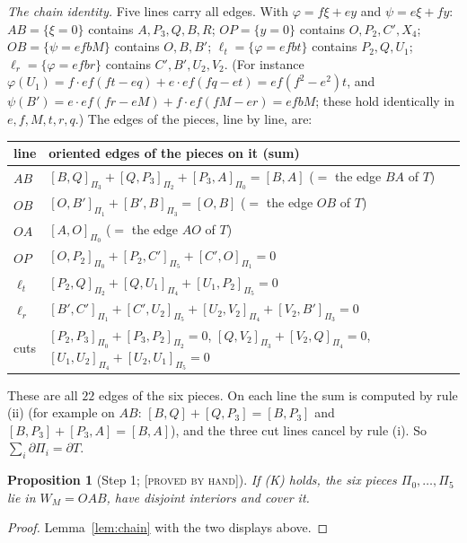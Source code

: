 \documentclass[11pt,reqno]{amsart}
\theoremstyle{plain}
\newtheorem{proposition}[theorem]{Proposition}
\theoremstyle{definition}
\newcommand{\lab}[1]{\textup{[\textsc{#1}]}}
\newcommand{\PH}{\lab{proved by hand}}
\begin{document}
\emph{The chain identity.} Five lines carry all edges. With $\varphi=f\xi+ey$ and $\psi=e\xi+fy$: $AB=\{\xi=0\}$ contains $A,P_3,Q,B,R$; $OP=\{y=0\}$ contains $O,P_2,C',X_4$; $OB=\{\psi=efbM\}$ contains $O,B,B'$; $\ell_t=\{\varphi=efbt\}$ contains $P_2,Q,U_1$; $\ell_r=\{\varphi=efbr\}$ contains $C',B',U_2,V_2$. (For instance $\varphi(U_1)=f\cdot ef(ft-eq)+e\cdot ef(fq-et)=ef(f^2-e^2)t$, and $\psi(B')=e\cdot ef(fr-eM)+f\cdot ef(fM-er)=efbM$; these hold identically in $e,f,M,t,r,q$.) The edges of the pieces, line by line, are:
\begin{center}\small
\begin{tabular}{@{}ll@{}}
\toprule
line & oriented edges of the pieces on it (sum)\\
\midrule
$AB$ & $[B,Q]_{\Pi_3}+[Q,P_3]_{\Pi_2}+[P_3,A]_{\Pi_0}=[B,A]$ \quad ($=$ the edge $BA$ of $T$)\\
$OB$ & $[O,B']_{\Pi_1}+[B',B]_{\Pi_3}=[O,B]$ \quad ($=$ the edge $OB$ of $T$)\\
$OA$ & $[A,O]_{\Pi_0}$ \quad ($=$ the edge $AO$ of $T$)\\
$OP$ & $[O,P_2]_{\Pi_0}+[P_2,C']_{\Pi_5}+[C',O]_{\Pi_1}=0$\\
$\ell_t$ & $[P_2,Q]_{\Pi_2}+[Q,U_1]_{\Pi_4}+[U_1,P_2]_{\Pi_5}=0$\\
$\ell_r$ & $[B',C']_{\Pi_1}+[C',U_2]_{\Pi_5}+[U_2,V_2]_{\Pi_4}+[V_2,B']_{\Pi_3}=0$\\
cuts & $[P_2,P_3]_{\Pi_0}+[P_3,P_2]_{\Pi_2}=0$, $[Q,V_2]_{\Pi_3}+[V_2,Q]_{\Pi_4}=0$, $[U_1,U_2]_{\Pi_4}+[U_2,U_1]_{\Pi_5}=0$\\
\bottomrule
\end{tabular}
\end{center}
These are all $22$ edges of the six pieces. On each line the sum is computed by rule (ii) (for example on $AB$: $[B,Q]+[Q,P_3]=[B,P_3]$ and $[B,P_3]+[P_3,A]=[B,A]$), and the three cut lines cancel by rule (i). So $\sum_i\partial\Pi_i=\partial T$.
\begin{proposition}[Step 1; \PH{}]\label{prop:step1}
If (K) holds, the six pieces $\Pi_0,\dots,\Pi_5$ lie in $W_M=OAB$, have disjoint interiors and cover it.
\end{proposition}
\begin{proof}
Lemma~\ref{lem:chain} with the two displays above.
\end{proof}
\end{document}
